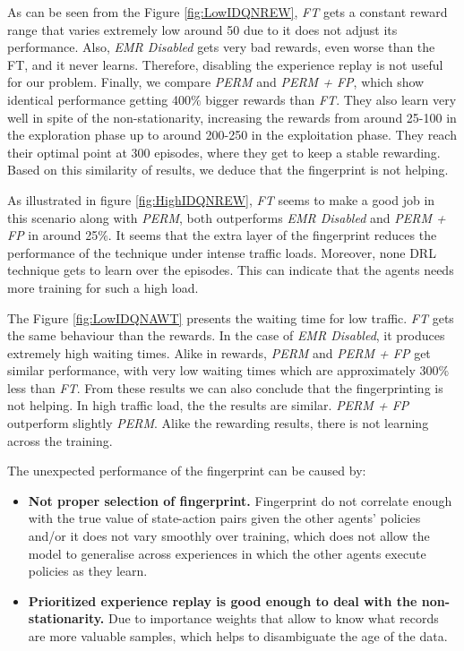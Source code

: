 \documentclass{llncs}
\begin{document}
As can be seen from the Figure \ref{fig:LowIDQNREW}, \textit{FT} gets a constant reward range that varies extremely low around 50 due to it does not adjust its performance. Also, \textit{EMR Disabled} gets very bad rewards, even worse than the FT, and it never learns. Therefore, disabling the experience replay is not useful for our problem. Finally, we compare \textit{PERM} and \textit{PERM + FP}, which show identical performance getting 400$\%$ bigger rewards than \textit{FT}. They also learn very well in spite of the non-stationarity, increasing the rewards from around 25-100 in the exploration phase up to around 200-250 in the exploitation phase. They reach their optimal point at 300 episodes, where they get to keep a stable rewarding. Based on this similarity of results, we deduce that the fingerprint is not helping.

As illustrated in figure \ref{fig:HighIDQNREW}, \textit{FT} seems to make a good job in this scenario along with \textit{PERM}, both outperforms \textit{EMR Disabled} and \textit{PERM + FP} in around 25$\%$. It seems that the extra layer of the fingerprint reduces the performance of the technique under intense traffic loads. Moreover, none DRL technique gets to learn over the episodes. This can indicate that the agents needs more training for such a high load. 

The Figure \ref{fig:LowIDQNAWT} presents the waiting time for low traffic. \textit{FT} gets the same  behaviour than the rewards. In the case of \textit{EMR Disabled}, it  produces extremely high waiting times. Alike in rewards, \textit{PERM} and \textit{PERM + FP} get similar performance, with very low waiting times which are approximately 300$\%$ less than \textit{FT}. From these results we can also conclude that the fingerprinting is not helping. In high traffic load, the the results are similar. \textit{PERM + FP} outperform slightly \textit{PERM}. Alike the rewarding results, there is not learning across the training.

The unexpected performance of the fingerprint can be caused by:  

\begin{itemize}
\item \textbf{Not proper selection of fingerprint.} Fingerprint do not correlate enough with the true value of state-action pairs given the other agents' policies and/or it does not vary smoothly over training, which does not allow the model to generalise across experiences in which the other agents execute policies as they learn.
\item \textbf{Prioritized experience replay is good enough to deal with the non-stationarity.} Due to importance weights that allow to know what records are more valuable samples, which helps to disambiguate the age of the data.
\end{itemize}
\end{document}
